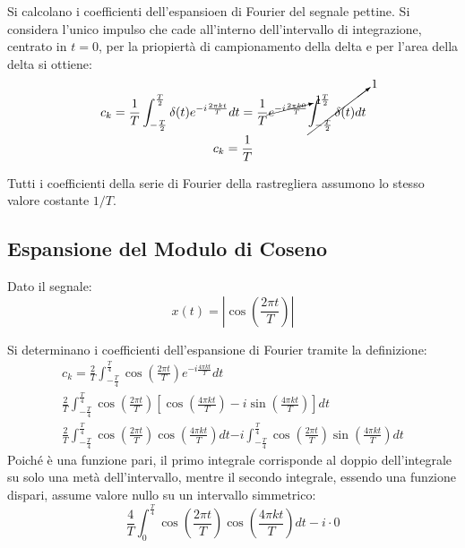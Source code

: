 \documentclass{article}
\numberwithin{equation}{subsection}
\begin{document}
Si calcolano i coefficienti dell'espansioen di Fourier del segnale pettine. Si considera l'unico impulso che cade all'interno dell'intervallo di integrazione, centrato 
in $t=0$, per la priopiertà di campionamento della delta e per l'area della delta si ottiene:
\begin{gather*}
    c_k=\displaystyle\frac{1}{T}\int_{-\frac{T}{2}}^{\frac{T}{2}}\delta(t)e^{-i\frac{2\pi kt}{T}}dt=\frac{1}{T}\cancelto{1}{e^{-i{\frac{2\pi k0}{T}}}}\cancelto{1}{\int_{-\frac{T}{2}}^{\frac{T}{2}}\delta(t)dt}\\
    c_k=\displaystyle\frac{1}{T}
\end{gather*}

Tutti i coefficienti della serie di Fourier della rastregliera assumono lo stesso valore costante $1/T$. 

\subsection{Espansione del Modulo di Coseno}
Dato il segnale:
\begin{equation*}
    x(t)=\left|\cos\left(\displaystyle\frac{2\pi t}{T}\right)\right|
\end{equation*}

Si determinano i coefficienti dell'espansione di Fourier tramite la definizione:
\begin{gather*}
    c_k=\displaystyle\frac{2}{T}\int_{-\frac{T}{4}}^{\frac{T}{4}}\cos\left(\displaystyle\frac{2\pi t}{T}\right)e^{-i\frac{4\pi kt}{T}}dt\\
    \displaystyle\frac{2}{T}\int_{-\frac{T}{4}}^{\frac{T}{4}}\cos\left(\displaystyle\frac{2\pi t}{T}\right)\left[\cos\left(\frac{4\pi kt}{T}\right)-i\sin\left(\frac{4\pi kt}{T}\right)\right]dt\\
    \displaystyle\frac{2}{T}\int_{-\frac{T}{4}}^{\frac{T}{4}}\cos\left(\frac{2\pi t}{T}\right)\cos\left(\frac{4\pi kt}{T}\right)dt
    {-i\int_{-\frac{T}{4}}^{\frac{T}{4}}\cos\left(\frac{2\pi t}{T}\right)\sin\left(\frac{4\pi kt}{T}\right)dt}
\end{gather*}
Poiché è una funzione pari, il primo integrale corrisponde al doppio dell'integrale su solo una metà dell'intervallo, mentre il secondo integrale, essendo una funzione 
dispari, assume valore nullo su un intervallo simmetrico:
\begin{equation*}
    \displaystyle\frac{4}{T}\int_{0}^{\frac{T}{4}}\cos\left(\frac{2\pi t}{T}\right)\cos\left(\frac{4\pi kt}{T}\right)dt-i\cdot0
\end{equation*}
\end{document}
